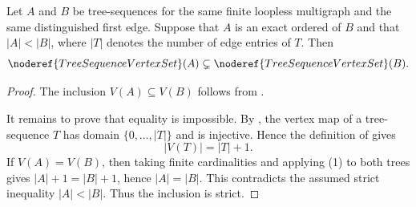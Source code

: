 \begin{lemma}
Let $A$ and $B$ be tree-sequences for the same finite loopless multigraph
and the same distinguished first edge.  Suppose that $A$ is an exact
ordered  of $B$ and that
$|A|<|B|$, where $|T|$ denotes the number of edge entries of $T$.
Then
\[
  \noderef{TreeSequenceVertexSet}(A)
  \subsetneq \noderef{TreeSequenceVertexSet}(B).
\]
\end{lemma}
\begin{proof}
The inclusion $V(A)\subseteq V(B)$ follows from
.

It remains to prove that equality is impossible.  By
, the vertex map of a tree-sequence $T$ has domain
$\{0,\ldots,|T|\}$ and is injective.  Hence the definition of
 gives
\[
                         |V(T)|=|T|+1.                         \tag{1}
\]
If $V(A)=V(B)$, then taking finite cardinalities and applying (1) to both
trees gives $|A|+1=|B|+1$, hence $|A|=|B|$.  This contradicts the assumed
strict inequality $|A|<|B|$.  Thus the inclusion is strict.
\end{proof}
